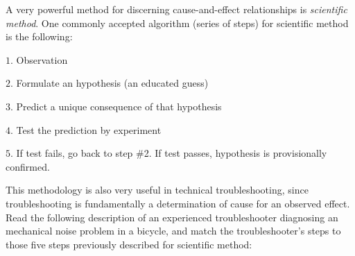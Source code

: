 

A very powerful method for discerning cause-and-effect relationships is {\it scientific method}.  One commonly accepted algorithm (series of steps) for scientific method is the following:

\medskip
\item{$1.$} Observation
\item{$2.$} Formulate an hypothesis (an educated guess)
\item{$3.$} Predict a unique consequence of that hypothesis
\item{$4.$} Test the prediction by experiment
\item{$5.$} If test fails, go back to step \#2.  If test passes, hypothesis is provisionally confirmed.
\medskip

This methodology is also very useful in technical troubleshooting, since troubleshooting is fundamentally a determination of cause for an observed effect.  Read the following description of an experienced troubleshooter diagnosing an mechanical noise problem in a bicycle, and match the troubleshooter's steps to those five steps previously described for scientific method:

